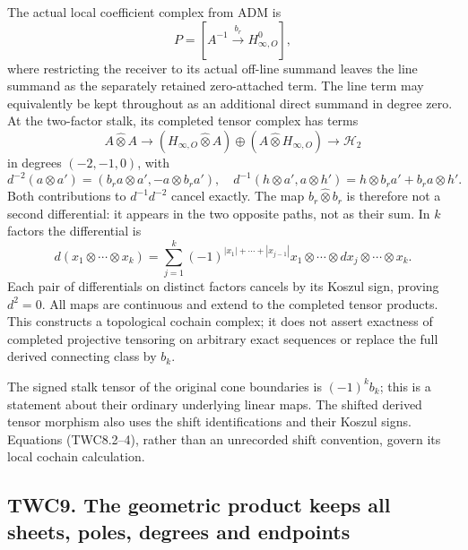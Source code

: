 The actual local coefficient complex from ADM is \[
P=[A^{-1}\xrightarrow{b_r}H_{\infty,O}^0],
\tag{TWC8.1}
\] where restricting the receiver to its actual off-line summand leaves
the line summand as the separately retained zero-attached term. The line
term may equivalently be kept throughout as an additional direct summand
in degree zero. At the two-factor stalk, its completed tensor complex
has terms \[
A\widehat\otimes A\longrightarrow
(H_{\infty,O}\widehat\otimes A)\oplus(A\widehat\otimes H_{\infty,O})
\longrightarrow\mathscr H_2
\tag{TWC8.2}
\] in degrees \((-2,-1,0)\), with \[
d^{-2}(a\otimes a')=(b_ra\otimes a',-a\otimes b_ra'),
\quad d^{-1}(h\otimes a',a\otimes h')=h\otimes b_ra'+b_ra\otimes h'.
\tag{TWC8.3}
\] Both contributions to \(d^{-1}d^{-2}\) cancel exactly. The map
\(b_r\widehat\otimes b_r\) is therefore not a second differential: it
appears in the two opposite paths, not as their sum. In \(k\) factors
the differential is \[
d(x_1\otimes\cdots\otimes x_k)=
\sum_{j=1}^k(-1)^{|x_1|+\cdots+|x_{j-1}|}
 x_1\otimes\cdots\otimes dx_j\otimes\cdots\otimes x_k.
\tag{TWC8.4}
\] Each pair of differentials on distinct factors cancels by its Koszul
sign, proving \(d^2=0\). All maps are continuous and extend to the
completed tensor products. This constructs a topological cochain
complex; it does not assert exactness of completed projective tensoring
on arbitrary exact sequences or replace the full derived connecting
class by \(b_k\).

The signed stalk tensor of the original cone boundaries is
\((-1)^kb_k\); this is a statement about their ordinary underlying
linear maps. The shifted derived tensor morphism also uses the shift
identifications and their Koszul signs. Equations (TWC8.2--4), rather
than an unrecorded shift convention, govern its local cochain
calculation.

\subsection{TWC9. The geometric product keeps all sheets, poles, degrees
and
endpoints}\label{twc9.-the-geometric-product-keeps-all-sheets-poles-degrees-and-endpoints}

